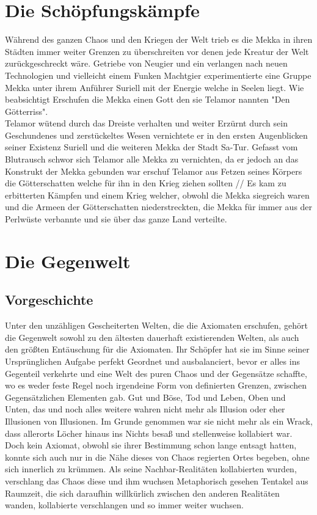 \documentclass[a4paper,12pt,oneside]{book}
\begin{document}
\section{Die Schöpfungskämpfe}
Während des ganzen Chaos und den Kriegen der Welt trieb es die Mekka in ihren Städten immer weiter Grenzen zu überschreiten vor denen jede Kreatur der Welt zurückgeschreckt wäre. Getriebe von Neugier und ein verlangen nach neuen Technologien und vielleicht einem Funken Machtgier experimentierte eine Gruppe Mekka unter ihrem Anführer Suriell mit der Energie welche in Seelen liegt. Wie beabsichtigt Erschufen die Mekka einen Gott den sie Telamor nannten "Den Götterriss". \\
Telamor wütend durch das Dreiste verhalten und weiter Erzürnt durch sein Geschundenes und zerstückeltes Wesen vernichtete er in den ersten Augenblicken seiner Existenz Suriell und die weiteren Mekka der Stadt Sa-Tur. Gefasst vom Blutrausch schwor sich Telamor alle Mekka zu vernichten, da er jedoch an das Konstrukt der Mekka gebunden war erschuf Telamor aus Fetzen seines Körpers die Götterschatten welche für ihn in den Krieg ziehen sollten //
Es kam zu erbitterten Kämpfen und einem Krieg welcher, obwohl die Mekka siegreich waren und die Armeen der Götterschatten niederstreckten, die Mekka für immer aus der Perlwüste verbannte und sie über das ganze Land verteilte. 

\section{Die Gegenwelt}
\subsection{Vorgeschichte}
Unter den unzähligen Gescheiterten Welten, die die Axiomaten erschufen, gehört die Gegenwelt sowohl zu den ältesten dauerhaft existierenden Welten, als auch den größten Entäuschung für die Axiomaten. Ihr Schöpfer hat sie im Sinne seiner Ursprünglichen Aufgabe perfekt Geordnet und ausbalanciert, bevor er alles ins Gegenteil verkehrte und eine Welt des puren Chaos und der Gegensätze schaffte, wo es weder feste Regel noch irgendeine Form von definierten Grenzen, zwischen Gegensätzlichen Elementen gab. Gut und Böse, Tod und Leben, Oben und Unten, das und noch alles weitere wahren nicht mehr als Illusion oder eher Illusionen von Illusionen. Im Grunde genommen war sie nicht mehr als ein Wrack, dass allerorts Löcher hinaus ins Nichts besaß und stellenweise kollabiert war. Doch kein Axiomat, obwohl sie ihrer Bestimmung schon lange entsagt hatten, konnte sich auch nur in die Nähe dieses von Chaos regierten Ortes begeben, ohne sich innerlich zu krümmen. Als seine Nachbar-Realitäten kollabierten wurden, verschlang das Chaos diese und ihm wuchsen Metaphorisch gesehen Tentakel aus Raumzeit, die sich daraufhin willkürlich zwischen den anderen Realitäten wanden, kollabierte verschlangen und so immer weiter wuchsen.
\end{document}
